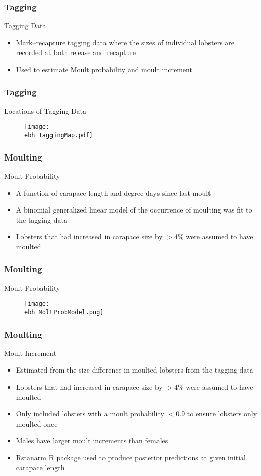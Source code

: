 \documentclass{beamer}
\newcommand{\ebh}{/SpinDr/backup/bio_data/bio.lobster/figures/LFA3438Framework2019/Brad/} %
\begin{document}
\begin{frame}
\frametitle{Tagging}
Tagging Data
\begin{itemize}
\item Mark–recapture tagging data where the sizes of individual lobsters are recorded at both release and recapture
\item Used to estimate Moult probability and moult increment
\end{itemize}
\end{frame}


\begin{frame}
\frametitle{Tagging}
Locations of Tagging Data
\begin{figure}
        \begin{center}
            \texttt{[image: \\ebh TaggingMap.pdf]}
        \end{center}
    \end{figure}
\end{frame}



\begin{frame}
\frametitle{Moulting}
Moult Probability 
\begin{itemize}
\item A function of carapace length and degree days since last moult
\item A binomial generalized linear model of the occurrence of moulting was fit to the tagging data
\item Lobsters that had increased in carapace size by $>$4\% were assumed to have moulted
\end{itemize}
\end{frame}



\begin{frame}
\frametitle{Moulting}
Moult Probability 
\begin{figure}
        \begin{center}
            \texttt{[image: \\ebh MoltProbModel.png]}
        \end{center}
    \end{figure}
\end{frame}



\begin{frame}
\frametitle{Moulting}
Moult Increment 
\begin{itemize}
\item Estimated from the size difference in moulted lobsters from the tagging data
\item Lobsters that had increased in carapace size by $>$4\% were assumed to have moulted
\item Only included lobsters with a moult probability $<$0.9 to ensure lobsters only moulted once 
\item Males have larger moult increments than females
\item Rstanarm R package used to produce posterior predictions at given initial carapace length
\end{itemize}
    \end{frame}
\end{document}
